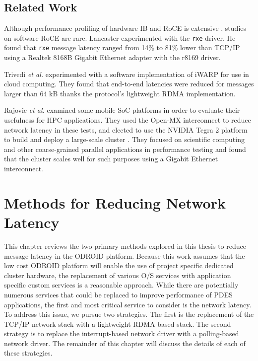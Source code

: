 \documentclass[11pt]{book}
\begin{document}
\section{Related Work}

Although performance profiling of hardware IB and RoCE is extensive
\cite{subamaroni-09,vienne-12}, studies on software RoCE are rare.  Lancaster
\cite{lancaster-10} experimented with the \verb;rxe; driver.  He found that \verb;rxe;
message latency ranged from 14\% to 81\% lower than TCP/IP using a Realtek 8168B Gigabit
Ethernet adapter with the r8169 driver.

Trivedi \emph{et al.} \cite{trivedi-11} experimented with a software implementation of
iWARP for use in cloud computing.  They found that end-to-end latencies were reduced for
messages larger than 64 kB thanks the protocol's lightweight RDMA implementation.

Rajovic \emph{et al.} \cite{rajovic-13} examined some mobile SoC platforms in order to
evaluate their usefulness for HPC applications.  They used the Open-MX interconnect to
reduce network latency in these tests, and elected to use the NVIDIA Tegra 2 platform to
build and deploy a large-scale cluster \cite{rajovic-14}.  They focused on scientific
computing and other coarse-grained parallel applications in performance testing and found
that the cluster scales well for such purposes using a Gigabit Ethernet interconnect.

\chapter{Methods for Reducing Network Latency}\label{latency_reduction}

This chapter reviews the two primary methods explored in this thesis to reduce message
latency in the ODROID platform.  Because this work assumes that the low cost ODROID
platform will enable the use of project specific dedicated cluster hardware, the
replacement of various O/S services with application specific custom services is a
reasonable approach.  While there are potentially numerous services that could be replaced
to improve performance of PDES applications, the first and most critical service to
consider is the network latency.  To address this issue, we pursue two strategies.  The
first is the replacement of the TCP/IP network stack with a lightweight RDMA-based stack.
The second strategy is to replace the interrupt-based network driver with a polling-based
network driver.  The remainder of this chapter will discuss the details of each of these
strategies. 
\end{document}
